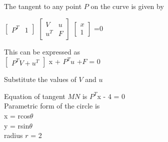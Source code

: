 \documentclass{beamer}
\begin{document}
\begin{frame}

The tangent to any point $P$ on the curve is given by
\vspace{0.5cm}


$\begin{bmatrix}

P^T & 1
\end{bmatrix}
$
$\begin{bmatrix}

V & u\\
u^T & F 
\end{bmatrix}
$
$
\begin{bmatrix}
x\\
1
\end{bmatrix}
$ =0
\vspace{0.5cm}


This can be expressed as\\
\vspace{1cm}
\hspace{1cm}
$
\begin{bmatrix}
P^TV + u^T
\end{bmatrix}
$
x + $P^T$$u$ +$F$ = $0$
\vspace{1cm}

Substitute the values of $V$ and $u$

\end{frame}

\begin{frame}

Equation of tangent $MN$ is 
$P^T$x - $4$ = $0$ 
\vspace{2cm}\\
Parametric form of the circle is  
\vspace{0.5cm}\\
x = rcos$\theta$ \\
y = rsin$\theta$
\\
\hspace{4cm}  radius $r$ = 2
\end{frame}
\end{document}
